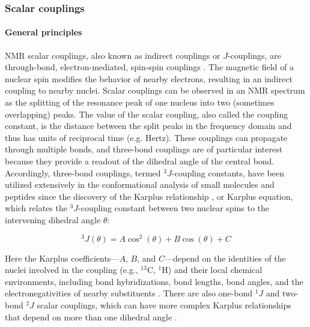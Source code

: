 \documentclass[9pt,review]{livecoms}
\begin{document}
\subsubsection{Scalar couplings}
\label{sub2:j_coupling}

\paragraph{General principles}

NMR scalar couplings, also known as indirect couplings or $J$-couplings, are through-bond, electron-mediated, spin-spin couplings \cite{karplus_contact_1959,karplus_vicinal_1963}.
The magnetic field of a nuclear spin modifies the behavior of nearby electrons, resulting in an indirect coupling to nearby nuclei.
Scalar couplings can be observed in an NMR spectrum as the splitting of the resonance peak of one nucleus into two (sometimes overlapping) peaks.
The value of the scalar coupling, also called the coupling constant, is the distance between the split peaks in the frequency domain and thus has units of reciprocal time (e.g. Hertz).
These couplings can propagate through multiple bonds, and three-bond couplings are of particular interest because they provide a readout of the dihedral angle of the central bond. Accordingly, three-bond couplings, termed $^3J$-coupling constants, have been utilized extensively in the conformational analysis of small molecules \cite{karplus_vicinal_1963} and peptides \cite{bystrov_spinspin_1976} since the discovery of the Karplus relationship \cite{karplus_contact_1959}, or Karplus equation, which relates the $^3J$-coupling constant between two nuclear spins to the intervening dihedral angle $\theta$:

\begin{equation}
\label{eqn:karplus}
^3J(\theta) = A \cos^2 (\theta) + B \cos (\theta) + C
\end{equation}

\noindent Here the Karplus coefficients---$A$, $B$, and $C$---depend on the identities of the nuclei involved in the coupling  (e.g., $^{13}$C, $^1$H) and their local chemical environments, including bond hybridizations, bond lengths, bond angles, and the electronegativities of nearby substituents \cite{haasnoot_relationship_1980}.
There are also one-bond $^1J$ and two-bond $^2J$ scalar couplings, which can have more complex Karplus relationships that depend on more than one dihedral angle \cite{vuister_use_1993,cornilescu_large_2000,wirmer_angular_2002,ding_protein_2004,gapsys_improved_2015}.
\end{document}
